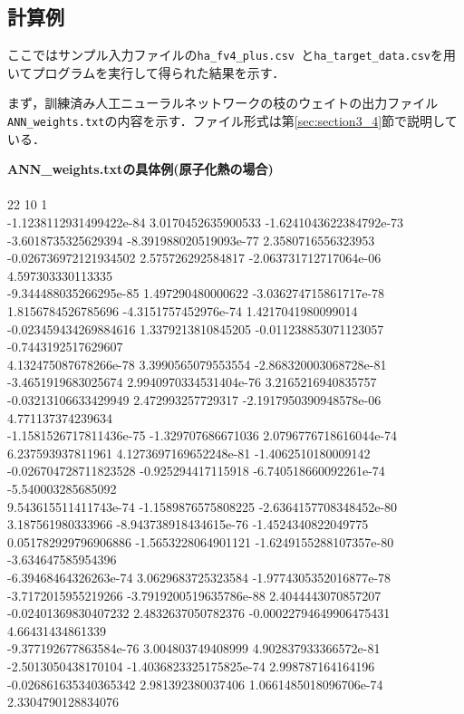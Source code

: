 \documentclass[11pt,titlepage,dvipdfmx,twoside]{jarticle}
\begin{document}
\subsection{計算例}
\label{sec:section5_2}

ここではサンプル入力ファイルの\verb|ha_fv4_plus.csv |と\verb|ha_target_data.csv|を用いてプログラムを実行して得られた結果を示す．

まず，訓練済み人工ニューラルネットワークの枝のウェイトの出力ファイル\verb|ANN_weights.txt|の内容を示す．ファイル形式は第\ref{sec:section3_4}節で説明している．

\bigskip

\begin{oframed}
{\bf ANN\_weights.txtの具体例(原子化熱の場合)}\\\\
22 10 1  \\
-1.1238112931499422e-84 3.0170452635900533 -1.6241043622384792e-73 -3.6018735325629394 -8.391988020519093e-77 2.3580716556323953 -0.026736972121934502 2.575726292584817 -2.063731712717064e-06 4.597303330113335   \\
-9.344488035266295e-85 1.497290480000622 -3.036274715861717e-78 1.8156784526785696 -4.3151757452976e-74 1.4217041980099014 -0.023459434269884616 1.3379213810845205 -0.011238853071123057 -0.7443192517629607   \\
4.132475087678266e-78 3.3990565079553554 -2.868320003068728e-81 -3.4651919683025674 2.9940970334531404e-76 3.2165216940835757 -0.03213106633429949 2.472993257729317 -2.1917950390948578e-06 4.771137374239634   \\
-1.1581526717811436e-75 -1.329707686671036 2.0796776718616044e-74 6.237593937811961 4.1273697169652248e-81 -1.4062510180009142 -0.026704728711823528 -0.925294417115918 -6.740518660092261e-74 -5.540003285685092   \\
9.543615511411743e-74 -1.1589876575808225 -2.6364157708348452e-80 3.187561980333966 -8.943738918434615e-76 -1.4524340822049775 0.051782929796906886 -1.5653228064901121 -1.6249155288107357e-80 -3.634647585954396   \\
-6.39468464326263e-74 3.0629683725323584 -1.9774305352016877e-78 -3.7172015955219266 -3.7919200519635786e-88 2.4044443070857207 -0.02401369830407232 2.4832637050782376 -0.00022794649906475431 4.66431434861339   \\
-9.377192677863584e-76 3.004803749408999 4.902837933366572e-81 -2.5013050438170104 -1.4036823325175825e-74 2.998787164164196 -0.026861635340365342 2.981392380037406 1.0661485018096706e-74 2.3304790128834076   \\

\end{oframed}
\end{document}
